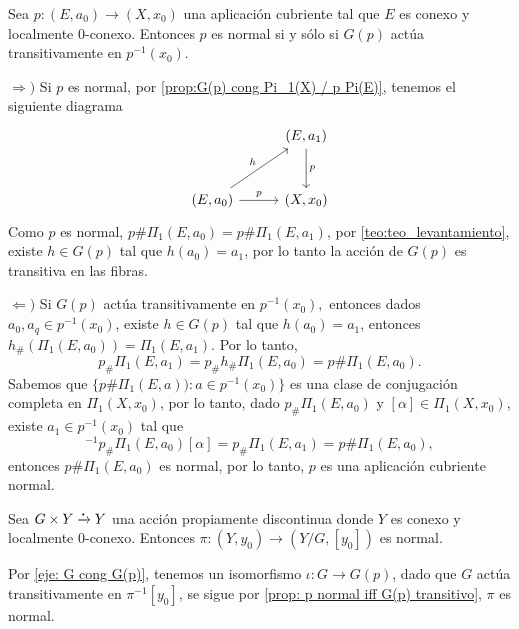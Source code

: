 \begin{prop}
    \label{prop: p normal iff G(p) transitivo}
    Sea $p:(E,a_0)\to(X,x_0)$ una aplicación cubriente tal que $E$ es conexo y localmente 0-conexo. Entonces $p$ es normal si y sólo si $G(p)$ actúa transitivamente en $p^{-1}(x_0)$.
\end{prop}
\begin{dem}
    $\Rightarrow)$ Si $p$ es normal, por \ref{prop:G(p) cong Pi_1(X) / p Pi(E)}, tenemos el siguiente diagrama
    \begin{equation*}
        \begin{tikzcd}[column sep=1cm, row sep=1cm]
            & (E,a_1)\arrow[d, "p"]\\
            (E,a_0)\arrow[ur, "h"]\arrow[r,"p"] & (X,x_0) 
        \end{tikzcd}
    \end{equation*}
    Como $p$ es normal, $p\#\Pi_1(E,a_0)=p\#\Pi_1(E,a_1)$, por \ref{teo:teo_levantamiento}, existe $h\in G(p)$ tal que $h(a_0)=a_1$, por lo tanto la acción de $G(p)$ es transitiva en las fibras.

    $\Leftarrow)$ Si $G(p)$ actúa transitivamente en $p^{-1}(x_0),$ entonces dados $a_0,a_q\in p^{-1}(x_0)$, existe $h\in G(p)$ tal que $h(a_0)=a_1$, entonces $h_\#(\Pi_1(E,a_0))=\Pi_1(E,a_1)$. Por lo tanto,
    \begin{equation*}
        p_\#\Pi_1(E,a_1)=p_\#h_\#\Pi_1(E,a_0)=p\#\Pi_1(E,a_0).
    \end{equation*}
    Sabemos que $\{p\#\Pi_1(E,a)):a\in p^{-1}(x_0)\}$ es una clase de conjugación completa en $\Pi_1(X,x_0)$, por lo tanto, dado $p_\#\Pi_1(E,a_0)$ y $[\alpha]\in\Pi_1(X,x_0)$, existe $a_1\in p^{-1}(x_0)$ tal que
    \begin{equation*}
        [\alpha]^{-1}p_\#\Pi_1(E,a_0)[\alpha]=p_\#\Pi_1(E,a_1)=p\#\Pi_1(E,a_0),
    \end{equation*}
    entonces $p\#\Pi_1(E,a_0)$ es normal, por lo tanto, $p$ es una aplicación cubriente normal.
\end{dem}
\begin{coro}
    Sea $G\times Y\xrightarrow{\bigdot} Y$ una acción propiamente discontinua donde $Y$ es conexo y localmente 0-conexo. Entonces $\pi:(Y,y_0)\to(Y/G,[y_0])$ es normal.
\end{coro}
\begin{dem}
    Por \ref{eje: G cong G(p)}, tenemos un isomorfismo $\iota:G\to G(p)$, dado que $G$ actúa transitivamente en $\pi^{-1}[y_0]$, se sigue
    por \ref{prop: p normal iff G(p) transitivo}, $\pi$ es normal.
\end{dem}
